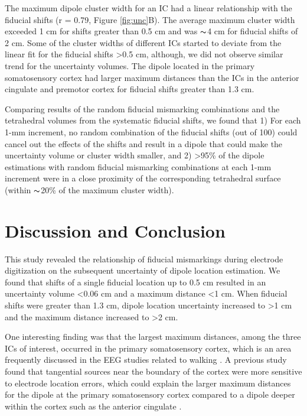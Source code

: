 \documentclass[../thesis_seyed.tex]{subfiles}
\begin{document}
The maximum dipole cluster width for an IC had a linear relationship with the fiducial shifts (r = 0.79, Figure \ref{fig:unc}B). The average maximum cluster width exceeded 1 cm for shifts greater than 0.5 cm and was $\thicksim$4 cm for fiducial shifts of 2 cm. Some of the cluster widths of different ICs started to deviate from the linear fit for the fiducial shifts >0.5 cm, although, we did not observe similar trend for the uncertainty volumes. The dipole located in the primary somatosensory cortex had larger maximum distances than the ICs in the anterior cingulate and premotor cortex for fiducial shifts greater than 1.3 cm.

Comparing results of the random fiducial mismarking combinations and the tetrahedral volumes from the systematic fiducial shifts, we found that 1) For each 1-mm increment, no random combination of the fiducial shifts (out of 100) could cancel out the effects of the shifts and result in a dipole that could make the uncertainty volume or cluster width smaller, and 2) >95\% of the dipole estimations with random fiducial mismarking combinations at each 1-mm increment were in a close proximity of the corresponding tetrahedral surface (within $\thicksim$20\% of the maximum cluster width).

\section{Discussion and Conclusion}
This study revealed the relationship of fiducial mismarkings during electrode digitization on the subsequent uncertainty of dipole location estimation. We found that shifts of a single fiducial location up to 0.5 cm resulted in an uncertainty volume <0.06 cm and a maximum distance <1 cm. When fiducial shifts were greater than 1.3 cm, dipole location uncertainty increased to >1 cm and the maximum distance increased to >2 cm.

One interesting finding was that the largest maximum distances, among the three ICs of interest,  occurred in the primary somatosensory cortex, which is an area frequently discussed in the EEG studies related to walking \cite{Peterson2018-ht,Luu2017-ph}. A previous study found that tangential sources near the boundary of the cortex were more sensitive to electrode location errors, which could explain the larger maximum distances for the dipole at the primary somatosensory cortex compared to a dipole deeper within the cortex such as the anterior cingulate \cite{Beltrachini2011-je}.
\end{document}
